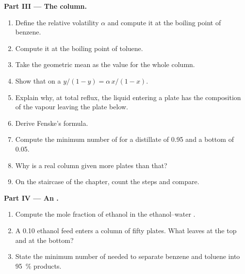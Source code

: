 \begin{problem}
\medskip
\noindent\textbf{Part III --- The column.}
\begin{enumerate}[resume]
  \item Define the relative volatility $\alpha$ and compute it at the boiling
        point of benzene.
  \item Compute it at the boiling point of toluene.
  \item Take the geometric mean as the value for the whole column.
  \item Show that on a  $y/(1 - y) = \alpha\,x/(1 - x)$.
  \item Explain why, at total reflux, the liquid entering a plate has the
        composition of the vapour leaving the plate below.
  \item Derive Fenske's formula.
  \item Compute the minimum number of  for a distillate of
        0.95 and a bottom of 0.05.
  \item Why is a real column given more plates than that?
  \item On the staircase of the chapter, count the steps and compare.
\end{enumerate}

\medskip
\noindent\textbf{Part IV --- An .}
\begin{enumerate}[resume]
  \item Compute the mole fraction of ethanol in the ethanol--water .
  \item A 0.10 ethanol feed enters a column of fifty plates. What leaves at
        the top and at the bottom?
  \item State the minimum number of  needed to separate
        benzene and toluene into 95~\% products.
\end{enumerate}
\end{problem}

